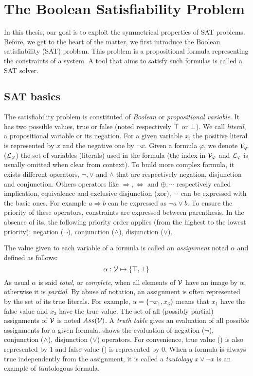 \chapter{The Boolean Satisfiability Problem}\label{chap:preliminaries}
\minitoc
In this thesis, our goal is to exploit the symmetrical properties of SAT problems.
Before, we get to the heart of the matter, we first introduce the Boolean satisfiability (SAT)  problem.
This problem is a propositional formula representing the constraints of a system.
A tool that aims to satisfy such formulas is called a SAT solver. 



\section{SAT basics}
The satisfiability problem is constituted of \emph{Boolean} or \emph{propositional variable}.
It has two possible values, true or false (noted respectively $\top$ or $\bot$).
We call \emph{literal}, a propositional variable or its negation.
For a given variable $x$, the positive literal is represented by $x$ and the negative one by $\neg x$.
Given a formula $\varphi$, we denote $\mathcal{V}_\varphi$ ($\mathcal{L}_\varphi$) the set of variables (literals) used in the formula (the index in $\mathcal{V}_\varphi$ and $\mathcal{L}_\varphi$ is usually omitted when
clear from context).
To build more complex formula, it exists different operators, $\neg, \lor$ and $\land$ that are respectively negation, disjunction and conjunction. Others operators like $\Rightarrow, \Leftrightarrow$ and
$\oplus, \cdots$ respectively called implication, equivalence and exclusive disjunction (xor), $\cdots$ can be 
expressed with the basic ones.
For example $a \Rightarrow b$ can be expressed as $ \neg a \lor b$.
To ensure the priority of these operators, constraints are expressed between parenthesis.
In the absence of its, the following priority order applies (from the highest to the lowest priority):
negation ($\neg$), conjunction ($\land$), disjunction ($\lor$).


The value given to each variable of a formula is called an \emph{assignment} noted $\alpha$ and defined as follows:
 $$\alpha: \mathcal{V} \mapsto \{ \top, \bot \}$$
 As usual $\alpha$ is said \emph{total}, or \emph{complete}, when all elements of $\mathcal{V}$ have an image by
$\alpha$, otherwise it is \emph{partial}. By abuse of notation, an assignment is
often represented by the set of its true literals. For example, $\alpha = \{\neg x_1, x_3 \}$ means that $x_1$
have the false value and $x_3$ have the true value.
  The set of all (possibly partial) assignments of $\mathcal{V}$ is noted $Ass(\mathcal{V})$.
A \emph{truth table} gives an evaluation of all possible assignments for a given formula.
 shows the evaluation of negation ($\neg$), conjunction ($\land$), disjunction ($\lor$) operators.
For convenience, true value (\true) is also represented by $1$ and false value (\false) is represented by $0$.
When a formula is always true independently from the assignment, it is called a \emph{tautology} $x \lor \neg x$ is 
an example of tautologous formula.


